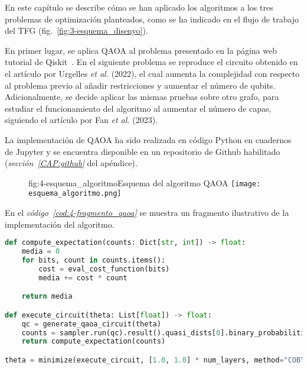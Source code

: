 En este capítulo se describe cómo se han aplicado los algoritmos a los tres problemas de optimización planteados, como se ha indicado en el flujo de trabajo del TFG (fig.~\ref{fig:3-esquema_disenyo}).

En primer lugar, se aplica QAOA al problema presentado en la página web tutorial de Qiskit~\cite{qiskit_tutorial_antiguo}.
En el siguiente problema se reproduce el circuito obtenido en el artículo por Urgelles \textit{et al.} (2022)\cite{multi-objective_routing_optimization}, el cual aumenta la complejidad con respecto al problema previo al añadir restricciones y aumentar el número de qubits.
Adicionalmente, se decide aplicar las mismas pruebas sobre otro grafo, para estudiar el funcionamiento del algoritmo al aumentar el número de capas, siguiendo el artículo por Fan \textit{et al.} (2023)\cite{solving_shortest_path_with_qaoa}.

La implementación de QAOA ha sido realizada en código Python en cuadernos de Jupyter y se encuentra disponible en un repositorio de Github habilitado (\textit{sección~\ref{CAP:github}} del apéndice).

\begin{figure}[Esquema del algoritmo]{fig:4-esquema_algoritmo}{Esquema del algoritmo QAOA}
  \centering
  \texttt{[image: esquema\_algoritmo.png]}
\end{figure}

En el \textit{código~\ref{cod:4-fragmento_qaoa}} se muestra un fragmento ilustrativo de la implementación del algoritmo.

\newpage

\begin{lstlisting}[language=Python,label=cod:4-fragmento_qaoa,caption={Fragmento de código de una ejecución de QAOA.},style=numbered]
def compute_expectation(counts: Dict[str, int]) -> float:
    media = 0
    for bits, count in counts.items():
        cost = eval_cost_function(bits)
        media += cost * count

    return media

def execute_circuit(theta: List[float]) -> float:
    qc = generate_qaoa_circuit(theta)
    counts = sampler.run(qc).result().quasi_dists[0].binary_probabilities()
    return compute_expectation(counts)

theta = minimize(execute_circuit, [1.0, 1.0] * num_layers, method="COBYLA")
\end{lstlisting}

